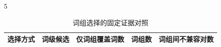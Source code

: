 \begin{PaperTable}{5}

\begin{table}[!htbp]
\centering\caption{词组选择的固定证据对照}
\begin{tabular}{@{}lrrrr@{}}
\toprule
\begin{minipage}[b]{\dimexpr 0.400000\linewidth-3.200000\tabcolsep\relax}\raggedright
选择方式\strut
\end{minipage} & \begin{minipage}[b]{\dimexpr 0.140000\linewidth-1.120000\tabcolsep\relax}\raggedleft
词级候选\strut
\end{minipage} & \begin{minipage}[b]{\dimexpr 0.190000\linewidth-1.520000\tabcolsep\relax}\raggedleft
仅词组覆盖词数\strut
\end{minipage} & \begin{minipage}[b]{\dimexpr 0.100000\linewidth-0.800000\tabcolsep\relax}\raggedleft
词组数\strut
\end{minipage} & \begin{minipage}[b]{\dimexpr 0.170000\linewidth-1.360000\tabcolsep\relax}\raggedleft
词组间不兼容对数\strut
\end{minipage}\tabularnewline
\midrule


\end{tabular}
\end{table}
\end{PaperTable}
